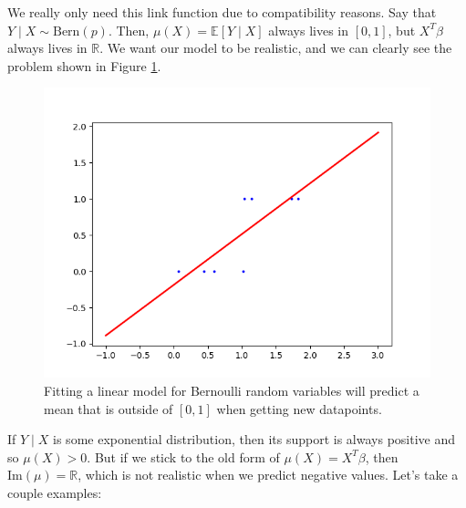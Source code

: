 \documentclass{article}
\begin{document}
  We really only need this link function due to compatibility reasons. Say that $Y \mid X \sim \mathrm{Bern}(p)$. Then, $\mu(X) = \mathbb{E}[Y \mid X]$ always lives in $[0, 1]$, but $X^T \beta$ always lives in $\mathbb{R}$. We want our model to be realistic, and we can clearly see the problem shown in Figure \ref{fig:Bernoulli_GLM}. 

  \begin{figure}[H]
    \centering
    \includegraphics[scale=0.5]{img/GLM_bernoulli.png}
    \caption{Fitting a linear model for Bernoulli random variables will predict a mean that is outside of $[0, 1]$ when getting new datapoints. }
    \label{fig:Bernoulli_GLM}
  \end{figure}

  If $Y \mid X$ is some exponential distribution, then its support is always positive and so $\mu(X) > 0$. But if we stick to the old form of $\mu(X) = X^T \beta$, then $\mathrm{Im}(\mu) = \mathbb{R}$, which is not realistic when we predict negative values. Let's take a couple examples: 
\end{document}
